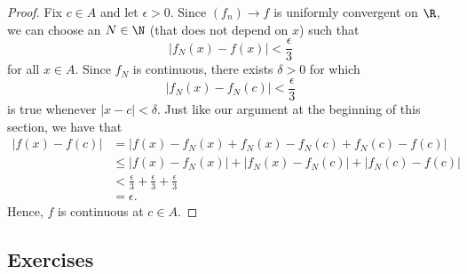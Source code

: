 \begin{proof}
Fix \( c \in A  \) and let \( \epsilon > 0  \). Since \( (f_n) \to f   \) is uniformly convergent on \( \R  \), we can choose an \( N \in \N   \) (that does not depend on \( x  \)) such that 
\[  | f_N(x) - f(x)  | < \frac{ \epsilon  }{ 3  }  \]
for all \( x \in A  \). Since \( f_N  \) is continuous, there exists \( \delta > 0  \) for which 
\[  | f_N(x) - f_N(c)  | < \frac{ \epsilon  }{ 3 }  \]
is true whenever \( | x - c  | < \delta  \). Just like our argument at the beginning of this section, we have that
\begin{align*}
    | f(x) - f(c)  | &= | f(x) - f_N(x) + f_N(x) - f_N(c) + f_N(c) - f(c)  |  \\
                     &\leq | f(x) - f_N(x)  | + | f_N(x) - f_N(c)  | + | f_N(c) - f(c)  | \\
                     &< \frac{ \epsilon  }{ 3  } + \frac{ \epsilon  }{ 3 } + \frac{ \epsilon  }{ 3  } \\
                     &= \epsilon.
\end{align*}
Hence, \( f  \) is continuous at \( c \in  A  \).
\end{proof}


\subsection{Exercises}

